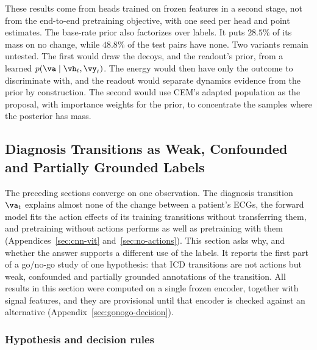 These results come from heads trained on frozen features in a second stage, not from the end-to-end pretraining objective, with one seed per head and point estimates. The base-rate prior also factorizes over labels. It puts $28.5\%$ of its mass on no change, while $48.8\%$ of the test pairs have none. Two variants remain untested. The first would draw the decoys, and the readout's prior, from a learned $p(\va\mid\vh_t,\vy_t)$. The energy would then have only the outcome to discriminate with, and the readout would separate dynamics evidence from the prior by construction. The second would use CEM's adapted population as the proposal, with importance weights for the prior, to concentrate the samples where the posterior has mass.


\subsection{Diagnosis Transitions as Weak, Confounded and Partially Grounded Labels}
\label{sec:gonogo}

The preceding sections converge on one observation. The diagnosis transition $\va_t$ explains almost none of the change between a patient's ECGs, the forward model fits the action effects of its training transitions without transferring them, and pretraining without actions performs as well as pretraining with them (Appendices~\ref{sec:cnn-vit} and~\ref{sec:no-actions}). This section asks why, and whether the answer supports a different use of the labels. It reports the first part of a go/no-go study of one hypothesis: that ICD transitions are not actions but weak, confounded and partially grounded annotations of the transition. All results in this section were computed on a single frozen encoder, together with signal features, and they are provisional until that encoder is checked against an alternative (Appendix~\ref{sec:gonogo-decision}).

\subsubsection{Hypothesis and decision rules}
\label{sec:gonogo-hypothesis}

